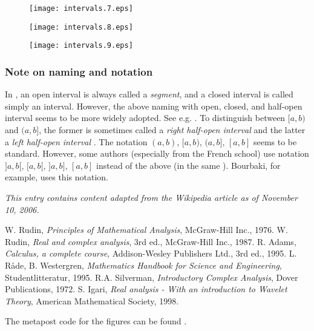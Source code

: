 \documentclass[12pt]{article}
\begin{document}
\begin{figure}[!htb]
\begin{center}
\texttt{[image: intervals.7.eps]}
\end{center}
\end{figure}

\begin{figure}[!htb]
\begin{center}
\texttt{[image: intervals.8.eps]}
\end{center}
\end{figure}

\begin{figure}[!htb]
\begin{center}
\texttt{[image: intervals.9.eps]}
\end{center}
\end{figure}

\subsubsection*{Note on naming and notation}
In \cite{rudin, rudin_real}, an open interval is always called
a \emph{segment}, and a closed interval is called simply an interval.
However, the above naming with open, closed, and half-open interval seems
to be more widely adopted. 
See e.g. \cite{adams, beta, silverman}. To distinguish between $[a,b)$ and
$(a,b]$, the former is sometimes called a \emph{right half-open interval } and
the latter a \emph{left half-open interval} \cite{igari}. 
The notation $(a,b)$, $[a,b)$, $(a,b]$, $[a,b]$ seems to be standard. However,  
some authors (especially from the French school) use notation
$]a,b[$, $[a,b[$, $]a,b]$, $[a,b]$ instead of the above (in the same ). Bourbaki, for example, uses this notation.

{\it This entry contains content adapted from the Wikipedia article  as of November 10, 2006.}

\begin{thebibliography}{9}
 W. Rudin, \emph{Principles of Mathematical Analysis}, McGraw-Hill Inc., 1976.
 W. Rudin, \emph{Real and complex analysis}, 3rd ed., McGraw-Hill Inc., 1987.
 R. Adams, \emph{Calculus, a complete course},
 Addison-Wesley Publishers Ltd., 3rd ed., 1995.
 L. R\r{a}de, B. Westergren,
 \emph{Mathematics Handbook for Science and Engineering},
 Studentlitteratur, 1995.
R.A. Silverman, \emph{Introductory Complex Analysis}, 
Dover Publications, 1972.
 S. Igari, \emph{Real analysis - With an introduction to Wavelet Theory}, American Mathematical Society, 1998.
\end{thebibliography}

The metapost code for the figures can be found
.
\end{document}
